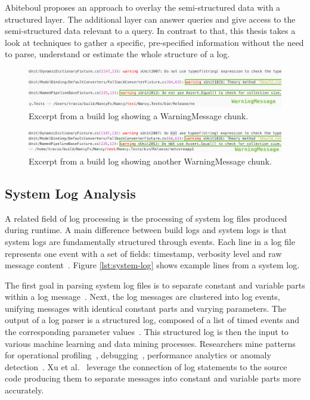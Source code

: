 \documentclass[\myrootdir/main.tex]{subfiles}
\begin{document}
Abiteboul proposes an approach to overlay the semi-structured data with a structured layer.
The additional layer can answer queries and give access to the semi-structured data relevant to a query.
In contrast to that, this thesis takes a look at techniques to gather a specific, pre-specified information without the need to parse, understand or estimate the whole structure of a log.

\begin{figure}[htbp]
	\centering
	\includegraphics[width=\textwidth, clip]{img/log42.png}
	\caption{Excerpt from a build log showing a WarningMessage chunk.}
	\label{fig:log-4}
\end{figure}
\begin{figure}[htbp]
	\centering
	\includegraphics[width=\textwidth, clip]{img/log52.png}
	\caption{Excerpt from a build log showing another WarningMessage chunk.}
	\label{fig:log-5}
\end{figure}

\subsection{System Log Analysis}
\label{sec:log-analysis}
A related field of log processing is the processing of system log files produced during runtime.
A main difference between build logs and system logs is that system logs are fundamentally structured through events.
Each line in a log file represents one event with a set of fields: timestamp, verbosity level and raw message content~\cite{he2017towards}.
Figure \ref{lst:system-log} shows example lines from a system log.

The first goal in parsing system log files is to separate constant and variable parts within a log message~\cite{nagappan2010abstracting,he2017towards}.
Next, the log messages are clustered into log events, unifying messages with identical constant parts and varying parameters.
The output of a log parser is a structured log, composed of a list of timed events and the corresponding parameter values~\cite{he2016evaluation}.
This structured log is then the input to various machine learning and data mining processes.
Researchers mine patterns for operational profiling~\cite{nagappan2009efficiently}, debugging~\cite{oliner2012advances}, performance analytics or anomaly detection~\cite{nagappan2010abstracting}.
Xu et al.~\cite{xu2009detecting} leverage the connection of log statements to the source code producing them to separate messages into constant and variable parts more accurately.
\end{document}
